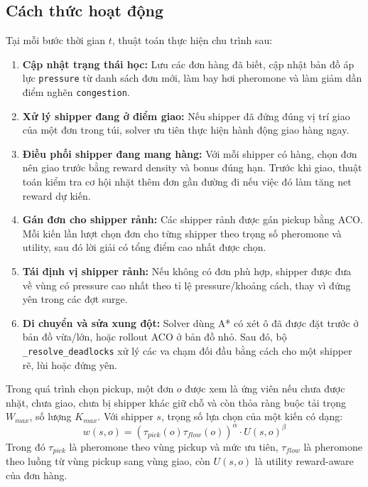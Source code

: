 \documentclass[conference]{IEEEtran}
\begin{document}
\subsection{Cách thức hoạt động}
Tại mỗi bước thời gian $t$, thuật toán thực hiện chu trình sau:

\begin{enumerate}
    \item \textbf{Cập nhật trạng thái học:} Lưu các đơn hàng đã biết, cập nhật bản đồ áp lực \texttt{pressure} từ danh sách đơn mới, làm bay hơi pheromone và làm giảm dần điểm nghẽn \texttt{congestion}.
    \item \textbf{Xử lý shipper đang ở điểm giao:} Nếu shipper đã đứng đúng vị trí giao của một đơn trong túi, solver ưu tiên thực hiện hành động giao hàng ngay.
    \item \textbf{Điều phối shipper đang mang hàng:} Với mỗi shipper có hàng, chọn đơn nên giao trước bằng reward density và bonus đúng hạn. Trước khi giao, thuật toán kiểm tra cơ hội nhặt thêm đơn gần đường đi nếu việc đó làm tăng net reward dự kiến.
    \item \textbf{Gán đơn cho shipper rảnh:} Các shipper rảnh được gán pickup bằng ACO. Mỗi kiến lần lượt chọn đơn cho từng shipper theo trọng số pheromone và utility, sau đó lời giải có tổng điểm cao nhất được chọn.
    \item \textbf{Tái định vị shipper rảnh:} Nếu không có đơn phù hợp, shipper được đưa về vùng có pressure cao nhất theo tỉ lệ pressure/khoảng cách, thay vì đứng yên trong các đợt surge.
    \item \textbf{Di chuyển và sửa xung đột:} Solver dùng A* có xét ô đã được đặt trước ở bản đồ vừa/lớn, hoặc rollout ACO ở bản đồ nhỏ. Sau đó, bộ \texttt{\_resolve\_deadlocks} xử lý các va chạm đối đầu bằng cách cho một shipper rẽ, lùi hoặc đứng yên.
\end{enumerate}

Trong quá trình chọn pickup, một đơn $o$ được xem là ứng viên nếu chưa được nhặt, chưa giao, chưa bị shipper khác giữ chỗ và còn thỏa ràng buộc tải trọng $W_{max}$, số lượng $K_{max}$. Với shipper $s$, trọng số lựa chọn của một kiến có dạng:
\begin{equation}
w(s,o) =
\left(\tau_{pick}(o)\tau_{flow}(o)\right)^{\alpha}
\cdot U(s,o)^{\beta}
\end{equation}
Trong đó $\tau_{pick}$ là pheromone theo vùng pickup và mức ưu tiên, $\tau_{flow}$ là pheromone theo luồng từ vùng pickup sang vùng giao, còn $U(s,o)$ là utility reward-aware của đơn hàng.
\end{document}
